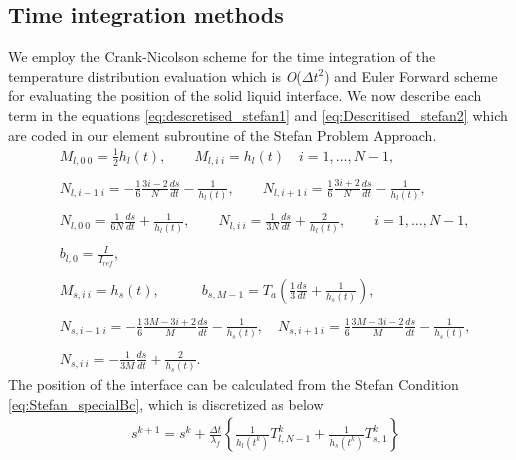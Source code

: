 \subsection{Time integration methods\label{sec:Stefan_time_integration}}
We employ the Crank-Nicolson scheme for the time integration of the temperature distribution evaluation which is \textit{O}($\Delta t^2$) and Euler Forward scheme for evaluating the position of the solid liquid interface. We now describe each term in the equations \ref{eq:descretised_stefan1} and \ref{eq:Descritised_stefan2} which are coded in our element subroutine of the Stefan Problem Approach.
\begin{subequations}
    \begin{align}
        &M_{l,0 \ 0} = \frac{1}{2}h_l(t), \quad \quad M_{l,i \ i} = h_l(t) \quad i = 1,\ldots,N-1,\label{eq:Stefan_material1}\\
        \nonumber \\
        &N_{l,i-1 \ i} = -\frac{1}{6}\frac{3i-2}{N}\frac{ds}{dt} - \frac{1}{h_l(t)}, \quad \quad N_{l,i+1 \ i} = \frac{1}{6}\frac{3i+2}{N}\frac{ds}{dt} - \frac{1}{h_l(t)}, \\
        \nonumber \\
        &N_{l,0 \ 0} = \frac{1}{6N}\frac{ds}{dt} + \frac{1}{h_l(t)}, \quad \quad N_{l,i \ i} = \frac{1}{3N}\frac{ds}{dt} + \frac{2}{h_l(t)}, \quad \quad i = 1,\ldots,N-1,\\
        \nonumber \\
        &b_{l,0} = \frac{I}{I_{ref}},\\
        \nonumber \\
        &M_{s,i \ i} = h_s(t), \quad \quad \quad b_{s,M-1} = T_a \left( \frac{1}{3} \frac{ds}{dt} + \frac{1}{h_s(t)} \right),\\
        \nonumber \\
        &N_{s,i-1 \ i} = -\frac{1}{6} \frac{3M-3i+2}{M} \frac{ds}{dt} - \frac{1}{h_s(t)}, \quad N_{s,i+1 \ i} = \frac{1}{6} \frac{3M-3i-2}{M} \frac{ds}{dt} - \frac{1}{h_s(t)},\\
        \nonumber \\
        &N_{s,i \ i} = -\frac{1}{3M} \frac{ds}{dt} + \frac{2}{h_s(t)}.\label{eq:Stefan_material2}
        \end{align}
\end{subequations}
The position of the interface can be calculated from the Stefan Condition \ref{eq:Stefan_specialBc}, which is discretized as below
\begin{subequations}
    \begin{align}       
        &s^{k+1} = s^{k} + \frac{\Delta t}{\lambda_f}\left \{ \frac{1}{h_l(t^k)}T_{l,N-1}^k + \frac{1}{h_s(t^k)}T_{s,1}^k \right \}
        \end{align}
\end{subequations}
